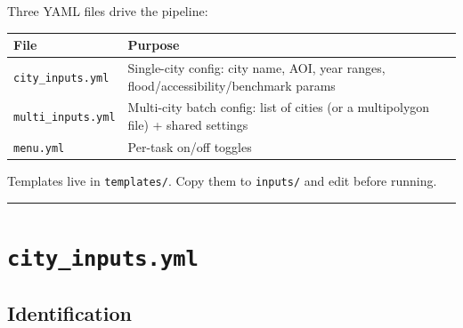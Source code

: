 \documentclass[
  letterpaper,
  DIV=11,
  numbers=noendperiod]{scrreprt}
\newcounter{none} %
\begin{document}
Three YAML files drive the pipeline:

{\def\LTcaptype{none} %
\begin{longtable}[]{@{}
  >{\raggedright\arraybackslash}p{}
  >{\raggedright\arraybackslash}p{}@{}}
\toprule\noalign{}
\begin{minipage}[b]{\linewidth}\raggedright
File
\end{minipage} & \begin{minipage}[b]{\linewidth}\raggedright
Purpose
\end{minipage} \\
\midrule\noalign{}
\endhead
\bottomrule\noalign{}
\endlastfoot
\texttt{city\_inputs.yml} & Single-city config: city name, AOI, year
ranges, flood/accessibility/benchmark params \\
\texttt{multi\_inputs.yml} & Multi-city batch config: list of cities (or
a multipolygon file) + shared settings \\
\texttt{menu.yml} & Per-task on/off toggles \\
\end{longtable}
}

Templates live in \texttt{templates/}. Copy them to \texttt{inputs/} and
edit before running.

\begin{center}\rule{0.5\linewidth}{0.5pt}\end{center}

\section{\texorpdfstring{\texttt{city\_inputs.yml}}{city\_inputs.yml}}\label{city_inputs.yml}

\subsection{Identification}\label{identification}
\end{document}
